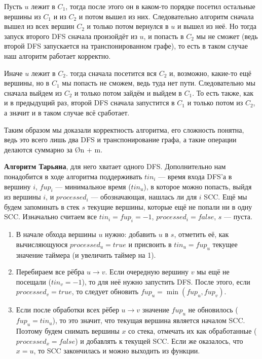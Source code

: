 Пусть $u$ лежит в $C_1$, тогда после этого он в каком-то порядке посетил остальные вершины из $C_1$ и из $C_2$ и потом вышел из них. Следовательно алгоритм сначала вышел из всех вершин $C_2$ и только потом вернулся в $u$ и вышел из неё. Но тогда запуск второго DFS сначала произойдёт из $u$, и попасть в $C_2$ мы не сможет (ведь второй DFS запускается на транспонированном графе), то есть в таком случае наш алгоритм работает корректно.

Иначе $u$ лежит в $C_2$. тогда сначала посетится вся $C_2$ и, возможно, какие-то ещё вершины, но в $C_1$ мы попасть не сможем, ведь туда нет пути. Следовательно мы сначала выйдем из $C_2$ и только потом зайдём и выйдем в $C_1$. То есть также, как и в предыдущий раз, второй DFS сначала запустится в $C_1$ и только потом из $C_2$, а значит и в таком случае всё сработает.

Таким образом мы доказали корректность алгоритма, его сложность понятна, ведь это всего лишь два DFS и транспонирование графа, а такие операции делаются суммарно за \O{n + m}.

\textbf{Алгоритм Тарьяна}, для него хватает одного DFS. Дополнительно нам понадобится в ходе алгоритма поддерживать $tin_i$ — время входа DFS'а в вершину $i$, $fup_i$ — минимальное время ($tin_u$), в которое можно попасть, выйдя из вершины $i$, и $processed_i$ — обозначающая, нашлась ли для $i$ SCC. Ещё мы будем запоминать в стек $s$ текущие вершины, которые ещё не попали ни в одну SCC. Изначально считаем все $tin_i = fup_i = -1$, $processed_i = false$, $s$ — пуста.

\begin{enumerate}
    \item В начале обхода вершины $u$ нужно: добавить $u$ в $s$, отметить её, как вычисляющуюся $processed_u = true$ и присвоить в $tin_u = fup_u$ текущее значение таймера (и увеличить таймер на 1).
    \item Перебираем все рёбра $u \to v$. Если очередную вершину $v$ мы ещё не посещали ($tin_v = -1$), то для неё нужно запустить DFS. После этого, если $processed_v = true$, то следует обновить $fup_u = \min(fup_u, fup_v)$.
    \item Если после обработки всех рёбер $u \to v$ значение $fup_u$ не обновилось ($fup_u = tin_u$), то это значит, что текущая вершина является началом SCC. Поэтому будем снимать вершины $x$ со стека, отмечать их как обработанные ($processed_x = false$) и добавлять к текущей SCC. Если же оказалось, что $x = u$, то SCC закончилась и можно выходить из функции.
\end{enumerate}


